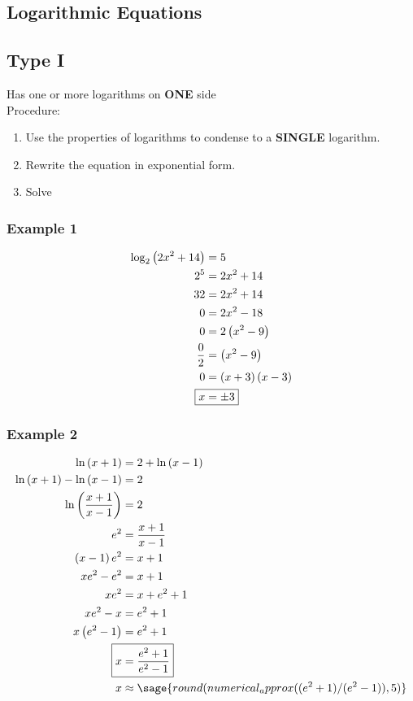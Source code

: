 \documentclass{amsart}
\begin{document}
\begin{footnotesize}
\begin{multicols}{4}
\columnbreak
\section*{Logarithmic Equations}
\subsection*{Type I}
Has one or more logarithms on \textbf{ONE} side\\
Procedure:
\begin{enumerate}
\item Use the properties of logarithms to condense to a \textbf{SINGLE} logarithm.
\item Rewrite the equation in exponential form.
\item Solve
\end{enumerate}
\subsubsection*{Example 1}
\begin{align*}
\log_2\left(2x^2+14\right)&=5\\
2^5&=2x^2+14\\
32&=2x^2+14\\
0&=2x^2-18\\
0&=2\left(x^2-9\right)\\
\frac {0} {2} &= \left( x^2-9 \right)\\
0 &= \left( x+3 \right) \left( x-3 \right) \\
\Aboxed{x&=\pm 3}
\end{align*}
\subsubsection*{Example 2}
\begin{align*}
\ln\left(x+1\right)&=2+\ln\left(x-1\right)\\
\ln\left(x+1\right)-\ln\left(x-1\right)&=2\\
\ln\left(\frac{x+1}{x-1}\right)&=2\\
e^2&=\frac{x+1}{x-1}\\
\left(x-1\right)e^2&=x+1\\
xe^2-e^2&=x+1\\
xe^2&=x+e^2+1\\
xe^2-x&=e^2+1\\
x\left(e^2-1\right)&=e^2+1\\
\Aboxed{x&=\frac{e^2+1}{e^2-1}}\\
x&\approx\sage{round(numerical_approx((e^2+1)/(e^2-1)),5)}
\end{align*}


\end{multicols}
\end{footnotesize}
\end{document}
